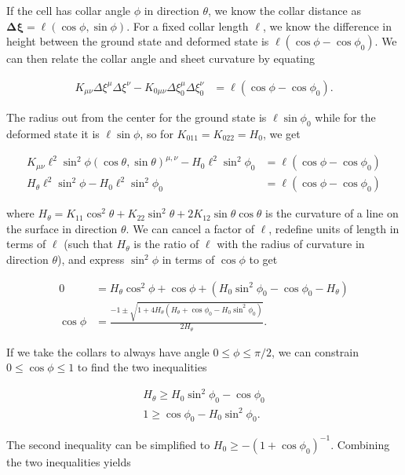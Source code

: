 If the cell has collar angle $\phi$ in direction $\theta$, we know the collar distance as $\bm{\Delta\xi} = \ell(\cos\phi, \sin\phi)$. For a fixed collar length $\ell$, we know the difference in height between the ground state and deformed state is $\ell(\cos\phi - \cos\phi_0)$. We can then relate the collar angle and sheet curvature by equating 

\begin{align}
    K_{\mu\nu}\Delta\xi^\mu\Delta\xi^\nu - K_{0\mu\nu}\Delta\xi_0^\mu\Delta\xi_0^\nu &= \ell(\cos\phi - \cos\phi_0). \label{eq:base}
\end{align}

The radius out from the center for the ground state is $\ell\sin\phi_0$ while for the deformed state it is $\ell\sin\phi$, so for $K_{011}=K_{022}=H_0$, we get

\begin{align*}
    K_{\mu\nu}\ell^2\sin^2\phi (\cos\theta, \sin\theta)^{\mu,\nu} - H_0 \ell^2\sin^2\phi_0 &= \ell(\cos\phi - \cos\phi_0) \\
    H_\theta \ell^2\sin^2\phi - H_0 \ell^2\sin^2\phi_0 &= \ell(\cos\phi - \cos\phi_0)
\end{align*}

\noindent where $H_\theta = K_{11}\cos^2\theta + K_{22}\sin^2\theta + 2K_{12}\sin\theta\cos\theta$ is the curvature of a line on the surface in direction $\theta$. We can cancel a factor of $\ell$, redefine units of length in terms of $\ell$ (such that $H_\theta$ is the ratio of $\ell$ with the radius of curvature in direction $\theta$), and express $\sin^2\phi$ in terms of $\cos\phi$ to get

\begin{align*}
    0 &= H_\theta \cos^2\phi + \cos\phi + (H_0\sin^2\phi_0 - \cos\phi_0 - H_\theta) \\
    \cos\phi &= \frac{-1 \pm \sqrt{1 + 4H_\theta (H_\theta + \cos\phi_0 - H_0\sin^2\phi_0)}}{2H_\theta}.
\end{align*}

If we take the collars to always have angle $0 \leq \phi \leq \pi/2$, we can constrain $0 \leq \cos\phi \leq 1$ to find the two inequalities 

\begin{align}
    H_\theta \geq H_0 \sin^2\phi_0 - \cos\phi_0 \label{eq:ineq1}\\
    1 \geq \cos\phi_0 - H_0 \sin^2\phi_0. \label{eq:ineq2}
\end{align}

\noindent The second inequality can be simplified to $H_0 \geq -(1+\cos\phi_0)^{-1}$. Combining the two inequalities yields 


